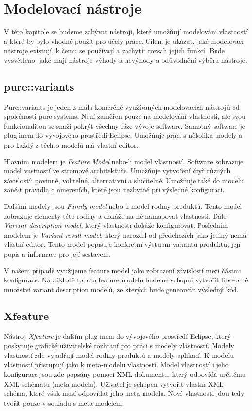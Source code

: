\chapter{Modelovací nástroje}

V této kapitole se budeme zabývat nástroji, které umožňují modelování vlastností a které by bylo vhodné použít pro účely práce. Cílem je ukázat, jaké modelovací nástroje existují, k čemu se používají a zachytit rozsah jejich funkcí. Bude vysvětleno, jaké mají nástroje výhody a nevýhody a odůvodnění výběru nástroje.

\section{pure::variants}

Pure::variants je jeden z mála komerčně využívaných modelovacích nástrojů od společnosti pure-systems. Není zaměřen pouze na modelování vlastností, ale svou funkcionalitou se snaží pokrýt všechny fáze vývoje software. Samotný software je plug-inem do vývojového prostředí Eclipse. Umožňuje práci s několika modely a pro každý z těchto modelů má vlastní editor.

Hlavním modelem je \textit{Feature Model} nebo-li model vlastností. Software zobrazuje model vastností ve stromové architektuře. Umožňuje vytvoření čtyř různých závislostí: povinné, volitelné, alternativní a slučitelné. Umožňuje také do modelu zanést pravidla o omezeních, které jsou nezbytné při výsledné konfiguraci. 

Dalšími modely jsou \textit{Family model} nebo-li model rodiny produktů. Tento model zobrazuje elementy této rodiny a dokáže na ně namapovat vlastnosti. Dále \textit{Variant description model}, který vlastnosti dokáže konfigurovat. Posledním modelem je \textit{Variant result model}, který narozdíl od předchozích jako jediný nemá vlastní editor. Tento model popisuje konkrétní výstupní variantu produktu, její popis a informace pro její sestavení.

V našem případě využijeme feature model jako zobrazení závislostí mezi částmi konfigurace. Na základě tohoto feature modelu budeme schopni vytvořit libovolné množství variant description modelů, ze kterých bude generován výsledný kód. 

\section{Xfeature}

Nástroj \textit{Xfeature} je dalším plug-inem do vývojového prostředí Eclipse, který poskytuje grafické uživatelské rozhraní pro práci s modely vlastností. Modely vlastností zde vyjadřují model rodiny produktů a modely aplikací. K modelu vlastností přistupují jako k meta-modelu vlastností. Model vlastností i jeho konfigurace jsou zde popsány pomocí XML dokumentu, který odpovídá určitému XML schématu (meta-modelu). Uživatel je schopen vytvořit vlastní XML schéma, které však musí odpovídat jeho meta-modelu. Nové vlastnosti jdou tedy tvořit pouze v souladu s meta-modelem.

